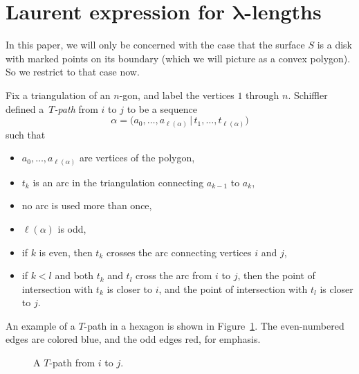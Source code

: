 \documentclass[pdftex]{sigma}
\numberwithin{equation}{section}
\begin{document}


\section[Laurent expression for lambda-lengths]{Laurent expression for $\boldsymbol{\lambda}$-lengths}

In this paper, we will only be concerned with the case that the surface $S$ is a disk with marked points on its boundary (which we will
picture as a convex polygon). So we restrict to that case now.

Fix a triangulation of an $n$-gon, and label the vertices $1$ through $n$.
Schiffler~\cite{schiffler_08} defined a~\emph{$T$-path} from $i$ to $j$ to be a sequence
\[ \alpha = \big(a_0,\dots,a_{\ell(\alpha)} \,|\, t_1,\dots,t_{\ell(\alpha)}\big) \]
such that
\begin{itemize}\itemsep=0pt
 \item[(T1)] $a_0,\dots,a_{\ell(\alpha)}$ are vertices of the polygon,
 \item[(T2)] $t_k$ is an arc in the triangulation connecting $a_{k-1}$ to $a_k$,
 \item[(T3)] no arc is used more than once,
 \item[(T4)] $\ell(\alpha)$ is odd,
 \item[(T5)] if $k$ is even, then $t_k$ crosses the arc connecting vertices $i$ and $j$,
 \item[(T6)] if $k < l$ and both $t_k$ and $t_l$ cross the arc from $i$ to $j$, then
 the point of intersection with $t_k$ is closer to $i$, and the point of intersection
 with $t_l$ is closer to $j$.
\end{itemize}

An example of a $T$-path in a hexagon is shown in Figure~\ref{fig:t_path}.
The even-numbered edges are colored blue, and the odd edges red, for emphasis.

\begin{figure}[h!] \centering


 \caption{A $T$-path from $i$ to $j$.} \label {fig:t_path}
\end{figure}
\end{document}
